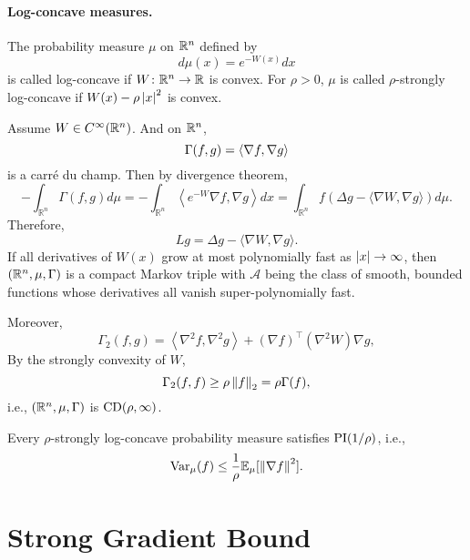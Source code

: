 \paragraph{Log-concave measures.}

\begin{defn}
    The probability measure $\mu$ on $\mathbb{R}^n$ defined by
    \begin{equation*}
    	d\mu(x) = e^{-W(x)}dx
    \end{equation*}
    is called log-concave if $W \colon \mathbb{R}^n \rightarrow \mathbb{R}$ is convex. For $\rho > 0$, $\mu$ is called $\rho$-strongly log-concave if $W(x) - \rho \left\lvert x\right\lvert^2$ is convex.
\end{defn}

Assume $W \in C^\infty(\mathbb{R}^n)$. And on $\mathbb{R}^n$,
\begin{equation*}
	\Gamma(f,g) = \left\langle \nabla f, \nabla g \right\rangle
\end{equation*}
is a carr\'e du champ. Then by divergence theorem,
\begin{equation*}
	-\int_{\mathbb{R}^n} \Gamma(f, g) d \mu=-\int_{\mathbb{R}^n}\left\langle e^{-W} \nabla f, \nabla g\right\rangle d x=\int_{\mathbb{R}^n} f(\Delta g-\langle\nabla W, \nabla g\rangle) d \mu.
\end{equation*}
Therefore,
\begin{equation*}
	L g=\Delta g-\langle\nabla W, \nabla g\rangle.
\end{equation*}
If all derivatives of $W(x)$ grow at most polynomially fast as $\left\lvert x\right\lvert \rightarrow \infty$, then $(\mathbb{R}^n,\mu,\Gamma)$ is a compact Markov triple with $\mathcal{A}$ being the class of smooth, bounded functions whose derivatives all vanish super-polynomially fast.

Moreover,
\begin{equation*}
	\Gamma_2(f, g)=\left\langle\nabla^2 f, \nabla^2 g\right\rangle+(\nabla f)^\top\left(\nabla^2 W\right)\nabla g,
\end{equation*}
By the strongly convexity of $W$,
\begin{equation*}
	\Gamma_2(f, f) \geq \rho \left\lVert f\right\lVert_2 = \rho \Gamma(f),
\end{equation*}
i.e., $(\mathbb{R}^n,\mu,\Gamma)$ is $\operatorname{CD}(\rho,\infty)$.

\begin{cor}
    Every $\rho$-strongly log-concave probability measure satisfies $\operatorname{PI}(1 / \rho)$, i.e.,
    \begin{equation*}
    	\operatorname{Var}_\mu(f) \leq \frac{1}{\rho} \mathbb{E}_\mu[\left\lVert\nabla f\right\lVert^2].
    \end{equation*}
\end{cor}

\section{Strong Gradient Bound}
























